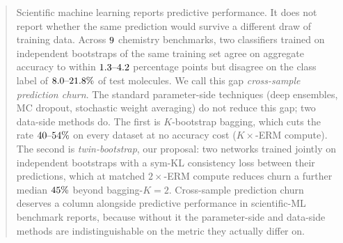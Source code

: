 \begin{abstract}
Scientific machine learning reports predictive performance.  It does not report whether the same
prediction would survive a different draw of training data.  Across $\nDatasetsHeadline$ chemistry benchmarks,
two classifiers trained on independent bootstraps of the same
training set agree on aggregate accuracy to within
$\accDiffMin\text{--}\accDiffMax$ percentage points but disagree on
the class label of $\churnMin\text{--}\churnMax\%$ of test
molecules.  We call this gap \emph{cross-sample prediction churn}.
The standard parameter-side techniques (deep ensembles, MC dropout, stochastic weight averaging)
do not reduce this gap; two data-side methods do.  The first is
$K$-bootstrap bagging, which cuts the rate
$\bagFiveLow\text{--}\bagFiveHigh\%$ on every dataset at no accuracy
cost ($K{\times}$-ERM compute).  The second is \emph{twin-bootstrap},
our proposal: two networks trained jointly on independent bootstraps
with a sym-KL consistency loss between their predictions, which at
matched $2{\times}$-ERM compute reduces churn a further median
$\twinFurtherMedianReductionVsBagTwo\%$ beyond bagging-$K{=}2$.
Cross-sample prediction churn deserves a column alongside
predictive performance in scientific-ML benchmark reports, because
without it the parameter-side and data-side methods are
indistinguishable on the metric they actually differ on.
\end{abstract}

